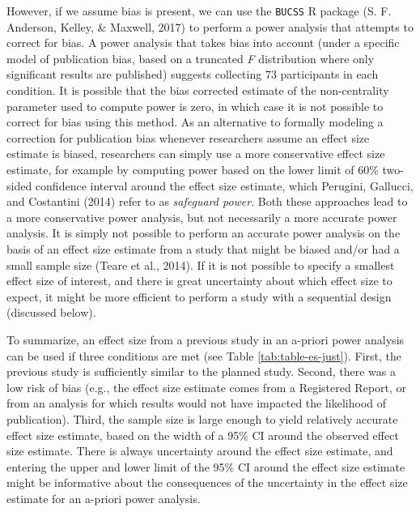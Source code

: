 \documentclass[
  english,
  ,jou, a4paper,floatsintext]{apa6}
\begin{document}
However, if we assume bias is present, we can use the \texttt{BUCSS} R package (S. F. Anderson, Kelley, \& Maxwell, 2017) to perform a power analysis that attempts to correct for bias. A power analysis that takes bias into account (under a specific model of publication bias, based on a truncated \emph{F} distribution where only significant results are published) suggests collecting 73 participants in each condition. It is possible that the bias corrected estimate of the non-centrality parameter used to compute power is zero, in which case it is not possible to correct for bias using this method. As an alternative to formally modeling a correction for publication bias whenever researchers assume an effect size estimate is biased, researchers can simply use a more conservative effect size estimate, for example by computing power based on the lower limit of 60\% two-sided confidence interval around the effect size estimate, which Perugini, Gallucci, and Costantini (2014) refer to as \emph{safeguard power}. Both these approaches lead to a more conservative power analysis, but not necessarily a more accurate power analysis. It is simply not possible to perform an accurate power analysis on the basis of an effect size estimate from a study that might be biased and/or had a small sample size (Teare et al., 2014). If it is not possible to specify a smallest effect size of interest, and there is great uncertainty about which effect size to expect, it might be more efficient to perform a study with a sequential design (discussed below).

To summarize, an effect size from a previous study in an a-priori power analysis can be used if three conditions are met (see Table \ref{tab:table-es-just}). First, the previous study is sufficiently similar to the planned study. Second, there was a low risk of bias (e.g., the effect size estimate comes from a Registered Report, or from an analysis for which results would not have impacted the likelihood of publication). Third, the sample size is large enough to yield relatively accurate effect size estimate, based on the width of a 95\% CI around the observed effect size estimate. There is always uncertainty around the effect size estimate, and entering the upper and lower limit of the 95\% CI around the effect size estimate might be informative about the consequences of the uncertainty in the effect size estimate for an a-priori power analysis.
\end{document}

